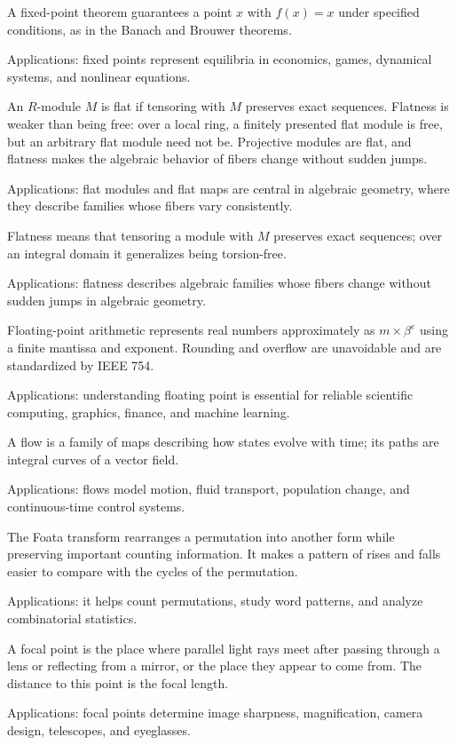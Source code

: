 A fixed-point theorem guarantees a point $x$ with $f(x)=x$ under specified conditions, as in the Banach and Brouwer theorems. \par\noindent Applications: fixed points represent equilibria in economics, games, dynamical systems, and nonlinear equations.

An $R$-module $M$ is flat if tensoring with $M$ preserves exact sequences. Flatness is weaker than being free: over a local ring, a finitely presented flat module is free, but an arbitrary flat module need not be. Projective modules are flat, and flatness makes the algebraic behavior of fibers change without sudden jumps. \par\noindent Applications: flat modules and flat maps are central in algebraic geometry, where they describe families whose fibers vary consistently.

Flatness means that tensoring a module with $M$ preserves exact sequences; over an integral domain it generalizes being torsion-free. \par\noindent Applications: flatness describes algebraic families whose fibers change without sudden jumps in algebraic geometry.

Floating-point arithmetic represents real numbers approximately as $m\times\beta^e$ using a finite mantissa and exponent. Rounding and overflow are unavoidable and are standardized by IEEE 754. \par\noindent Applications: understanding floating point is essential for reliable scientific computing, graphics, finance, and machine learning.

A flow is a family of maps describing how states evolve with time; its paths are integral curves of a vector field. \par\noindent Applications: flows model motion, fluid transport, population change, and continuous-time control systems.

The Foata transform rearranges a permutation into another form while preserving important counting information. It makes a pattern of rises and falls easier to compare with the cycles of the permutation. \par\noindent Applications: it helps count permutations, study word patterns, and analyze combinatorial statistics.

A focal point is the place where parallel light rays meet after passing through a lens or reflecting from a mirror, or the place they appear to come from. The distance to this point is the focal length. \par\noindent Applications: focal points determine image sharpness, magnification, camera design, telescopes, and eyeglasses.

